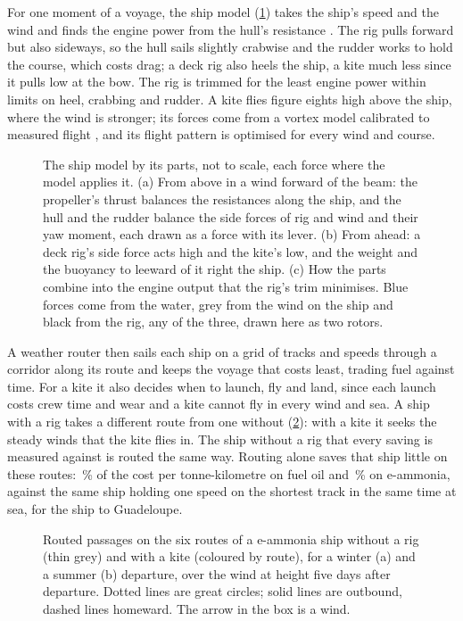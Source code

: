 \documentclass[10pt,a4paper]{article}
\begin{document}
For one moment of a voyage, the ship model (\cref{ea:ship_model}) takes the ship's speed and the wind and finds the engine power from the hull's resistance \citep{holtrop1982}. The rig pulls forward but also sideways, so the hull sails slightly crabwise and the rudder works to hold the course, which costs drag; a deck rig also heels the ship, a kite much less since it pulls low at the bow. The rig is trimmed for the least engine power within limits on heel, crabbing and rudder. A kite flies figure eights high above the ship, where the wind is stronger; its forces come from a vortex model calibrated to measured flight \citep{oehler2019}, and its flight pattern is optimised for every wind and course.

\begin{figure}[!htb]
\centering
{}
\caption{The ship model by its parts, not to scale, each force where the model applies it. (a) From above in a wind forward of the beam: the propeller's thrust balances the resistances along the ship, and the hull and the rudder balance the side forces of rig and wind and their yaw moment, each drawn as a force with its lever. (b) From ahead: a deck rig's side force acts high and the kite's low, and the weight and the buoyancy to leeward of it right the ship. (c) How the parts combine into the engine output that the rig's trim minimises. Blue forces come from the water, grey from the wind on the ship and black from the rig, any of the three, drawn here as two rotors.}
\label{ea:ship_model}
\end{figure}

A weather router then sails each ship on a grid of tracks and speeds through a corridor along its route and keeps the voyage that costs least, trading fuel against time. For a kite it also decides when to launch, fly and land, since each launch costs crew time and wear and a kite cannot fly in every wind and sea. A ship with a rig takes a different route from one without (\cref{ea:routes}): with a kite it seeks the steady winds that the kite flies in. The ship without a rig that every saving is measured against is routed the same way. Routing alone saves that ship little on these routes: \NumRoutingAloneOil\,\% of the cost per tonne-kilometre on fuel oil and \NumRoutingAloneAmmonia\,\% on e-ammonia, against the same ship holding one speed on the shortest track in the same time at sea, for the  ship to Guadeloupe.

\begin{figure}[!htb]
\centering
{}
\caption{ Routed passages on the six routes of a  e-ammonia ship without a rig (thin grey) and with a  kite (coloured by route), for a winter (a) and a summer (b) departure, over the wind at  height five days after departure. Dotted lines are great circles; solid lines are outbound, dashed lines homeward. The arrow in the box is a  wind.}
\label{ea:routes}
\end{figure}
\end{document}
